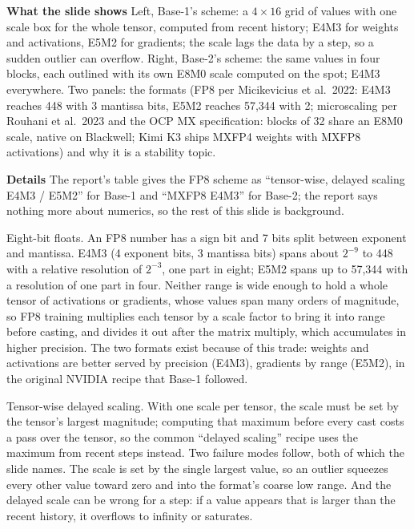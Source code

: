 \documentclass[11pt,letterpaper]{article}
\newcommand{\para}[1]{\medskip\noindent\textbf{#1}\quad}
\begin{document}
\para{What the slide shows} Left, Base-1's scheme: a $4\times16$ grid of values with one scale box for the whole tensor, computed from recent history; E4M3 for weights and activations, E5M2 for gradients; the scale lags the data by a step, so a sudden outlier can overflow. Right, Base-2's scheme: the same values in four blocks, each outlined with its own E8M0 scale computed on the spot; E4M3 everywhere. Two panels: the formats (FP8 per Micikevicius et al.\ 2022: E4M3 reaches 448 with 3 mantissa bits, E5M2 reaches 57,344 with 2; microscaling per Rouhani et al.\ 2023 and the OCP MX specification: blocks of 32 share an E8M0 scale, native on Blackwell; Kimi K3 ships MXFP4 weights with MXFP8 activations) and why it is a stability topic.

\para{Details} The report's table gives the FP8 scheme as ``tensor-wise, delayed scaling E4M3 / E5M2'' for Base-1 and ``MXFP8 E4M3'' for Base-2; the report says nothing more about numerics, so the rest of this slide is background.

Eight-bit floats. An FP8 number has a sign bit and 7 bits split between exponent and mantissa. E4M3 (4 exponent bits, 3 mantissa bits) spans about $2^{-9}$ to 448 with a relative resolution of $2^{-3}$, one part in eight; E5M2 spans up to 57,344 with a resolution of one part in four. Neither range is wide enough to hold a whole tensor of activations or gradients, whose values span many orders of magnitude, so FP8 training multiplies each tensor by a scale factor to bring it into range before casting, and divides it out after the matrix multiply, which accumulates in higher precision. The two formats exist because of this trade: weights and activations are better served by precision (E4M3), gradients by range (E5M2), in the original NVIDIA recipe that Base-1 followed.

Tensor-wise delayed scaling. With one scale per tensor, the scale must be set by the tensor's largest magnitude; computing that maximum before every cast costs a pass over the tensor, so the common ``delayed scaling'' recipe uses the maximum from recent steps instead. Two failure modes follow, both of which the slide names. The scale is set by the single largest value, so an outlier squeezes every other value toward zero and into the format's coarse low range. And the delayed scale can be wrong for a step: if a value appears that is larger than the recent history, it overflows to infinity or saturates.
\end{document}

